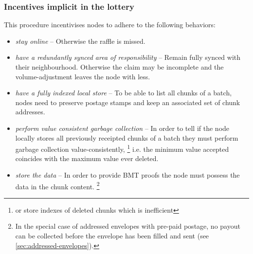 

\subsubsection{Incentives implicit in the lottery}

This procedure incentivises nodes to adhere to the following behaviors:

\begin{itemize}
\item \emph{stay online} -- Otherwise the raffle is missed.
\item \emph{have a redundantly synced area of responsibility} -- Remain fully synced with their neighbourhood. Otherwise the claim may be incomplete and the volume-adjustment leaves the node with less.
\item \emph{have a fully indexed local store} -- To be able to list all chunks of a batch, nodes need to preserve postage stamps and keep an associated set of chunk addresses. 
\item \emph{perform value consistent garbage collection} -- In order to tell if the node locally stores all previously receipted chunks of a batch they must perform garbage collection value-consistently,%
%
\footnote{or store indexes of deleted chunks which is inefficient}
i.e. the minimum value accepted coincides with the maximum value ever deleted.
%
\item \emph{store the data} -- In order to provide BMT proofs the node must possess the data in the chunk content.%
%
\footnote{In the special case of addressed envelopes with pre-paid postage, no payout can be collected before the envelope has been filled and sent (see \ref{sec:addressed-envelopes}).}
\end{itemize}



